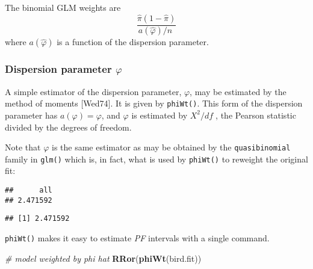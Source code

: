 \documentclass[]{article}
\newenvironment{Shaded}{\begin{snugshade}}{\end{snugshade}}
\newcommand{\KeywordTok}[1]{\textcolor[rgb]{0.13,0.29,0.53}{\textbf{{#1}}}}
\newcommand{\DataTypeTok}[1]{\textcolor[rgb]{0.13,0.29,0.53}{{#1}}}
\newcommand{\CommentTok}[1]{\textcolor[rgb]{0.56,0.35,0.01}{\textit{{#1}}}}
\newcommand{\NormalTok}[1]{{#1}}
\begin{document}
The binomial GLM weights are
\[\frac{\hat{\pi }(1-\hat{\pi })}{a(\hat{\varphi })/n\;}\] where
\(a(\hat{\varphi })\) is a function of the dispersion parameter.

\subsubsection{Dispersion parameter $\varphi$}

A simple estimator of the dispersion parameter, \(\varphi\), may be
estimated by the method of moments {[}Wed74{]}. It is given by
\texttt{phiWt()}. This form of the dispersion parameter has
\(a(\varphi)=\varphi\), and \(\varphi\) is estimated by
\({X^2}/{df}\;\), the Pearson statistic divided by the degrees of
freedom.

Note that \(\varphi\) is the same estimator as may be obtained by the
\texttt{quasibinomial} family in \texttt{glm()} which is, in fact, what
is used by \texttt{phiWt()} to reweight the original fit:

\begin{Shaded}
\end{Shaded}

\begin{verbatim}
##      all 
## 2.471592
\end{verbatim}

\begin{Shaded}
\end{Shaded}

\begin{verbatim}
## [1] 2.471592
\end{verbatim}

\bigskip
\texttt{phiWt()} makes it easy to estimate \emph{PF} intervals with a
single command. \bigskip

\begin{Shaded}
\begin{Highlighting}[]
\CommentTok{# model weighted by phi hat}
\KeywordTok{RRor}\NormalTok{(}\KeywordTok{phiWt}\NormalTok{(bird.fit))}
\end{Highlighting}
\end{Shaded}
\end{document}
